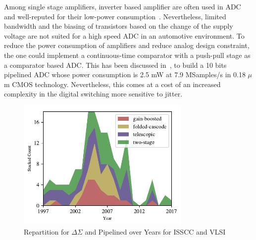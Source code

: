 Among single stage amplifiers, inverter based amplifier are often used in ADC and well-reputed for their low-power consumption~\cite{Selby2013,Ismail2016}. Nevertheless, limited bandwidth and the biasing of transistors based on the change of the supply voltage are not suited for a high speed ADC in an automotive environment.
To reduce the power consumption of amplifiers and reduce analog design constraint, the one could implement a continuous-time comparator with a push-pull stage as a comparator based ADC\@. This has been discussed in~\cite{Fiorenza2006}, to build a 10 bits pipelined ADC whose power consumption is 2.5 mW at 7.9 MSamples/s in 0.18 \(\mu \)m CMOS technology. Nevertheless, this comes at a cost of an increased complexity in the digital switching more sensitive to jitter. 

\begin{figure}[htp]
    \centering
    \includegraphics[width=0.75\textwidth]{Chapter7/Figs/amplifier_repartition.pdf}
    \caption{Repartition for \(\Delta\Sigma \) and Pipelined over Years for ISSCC and VLSI}
    \label{fig:ota_over_year}
\end{figure}

